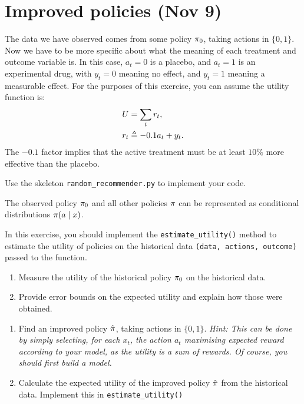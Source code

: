 \section{Improved policies (Nov 9)}

The data we have observed comes from some policy $\pi_0$, taking actions in $\{0,1\}$. Now we have to be more specific about what the meaning of each treatment and outcome variable is. In this case, $a_t = 0$ is a placebo, and $a_t = 1$ is an experimental drug, with $y_t = 0$ meaning no effect, and $y_t = 1$ meaning a measurable effect. For the purposes of this exercise, you can assume the utility function is:
\begin{align}
  U &= \sum_t r_t,\\
  r_t &\mathrel{\triangleq} - 0.1 a_t + y_t.
\end{align}
The $-0.1$ factor implies that the active treatment must be at least $10\%$ more effective than the placebo.

Use the skeleton \verb!random_recommender.py! to implement your code.

\begin{assumption}
  The observed policy $\pi_0$ and all other policies $\pi$ can be represented as conditional distributions $\pi(a \mid x)$. 
\end{assumption}

\begin{exercise}
  In this exercise, you should implement the \verb!estimate_utility()! method to estimate the utility of policies on the historical data \verb!(data, actions, outcome)! passed to the function.
    \begin{enumerate}
  \item Measure the utility of the historical policy $\pi_0$ on the historical
    data.
  \item Provide error bounds on the expected utility and explain how those were obtained.
  \end{enumerate}
\end{exercise}

\begin{exercise}
  \begin{enumerate}
  \item Find an improved policy $\hat{\pi}$, taking actions in $\{0,1\}$. \emph{Hint: This can be done by simply selecting, for each $x_t$, the action $a_t$ maximising expected reward according to your model, as the utility is a sum of rewards. Of course, you should first build a model.}
  \item Calculate the expected utility of the improved policy $\hat{\pi}$ from the historical data. Implement this in \verb!estimate_utility()!
  \end{enumerate}
\end{exercise}

